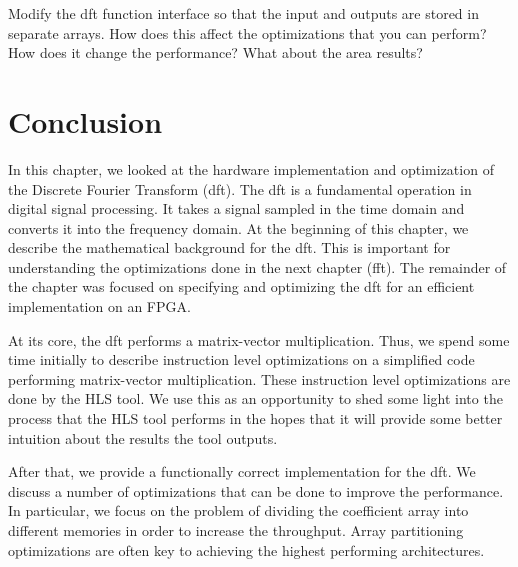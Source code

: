 \begin{exercise}
Modify the \gls{dft} function interface so that the input and outputs are stored in separate arrays. How does this affect the optimizations that you can perform? How does it change the performance? What about the area results?
\end{exercise}



\section{Conclusion}
In this chapter, we looked at the hardware implementation and optimization of the Discrete Fourier Transform (\gls{dft}). The \gls{dft} is a fundamental operation in digital signal processing. It takes a signal sampled in the time domain and converts it into the frequency domain. At the beginning of this chapter, we describe the mathematical background for the \gls{dft}. This is important for understanding the optimizations done in the next chapter (\gls{fft}). The remainder of the chapter was focused on specifying and optimizing the \gls{dft} for an efficient implementation on an FPGA.  

At its core, the \gls{dft} performs a matrix-vector multiplication. Thus, we spend some time initially to describe instruction level optimizations on a simplified code performing matrix-vector multiplication. These instruction level optimizations are done by the HLS tool. We use this as an opportunity to shed some light into the process that the HLS tool performs in the hopes that it will provide some better intuition about the results the tool outputs.

After that, we provide a functionally correct implementation for the \gls{dft}. We discuss a number of optimizations that can be done to improve the performance. In particular, we focus on the problem of dividing the coefficient array into different memories in order to increase the throughput. Array partitioning optimizations are often key to achieving the highest performing architectures. 

